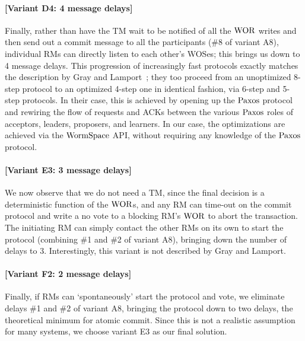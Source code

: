 \paragraph{[Variant D4: 4 message delays]} Finally, rather than have the TM wait to be notified of all the $\mathrm{WOR}$ 
writes and then send out a commit message to all the participants (\#8 of variant A8), 
individual RMs can directly listen to each other's WOSes; this brings us down to 4 message delays.
This progression of increasingly fast protocols exactly matches the description by Gray and Lamport~\cite{gray:2006}; 
they too proceed from an unoptimized 8-step protocol to an optimized 4-step one in identical fashion, via 6-step and 5-step protocols. 
In their case, this is achieved by opening up the $\mathrm{Paxos}$ protocol and rewiring the flow of requests and ACKs between the various 
$\mathrm{Paxos}$ roles of acceptors, leaders, proposers, and learners. In our case, the optimizations are achieved via the $\mathrm{WormSpace}$ API, 
without requiring any knowledge of the $\mathrm{Paxos}$ protocol.

\paragraph{[Variant E3: 3 message delays]} We now observe that we do not need a TM, 
since the final decision is a deterministic function of the $\mathrm{WOR}$s, 
and any RM can time-out on the commit protocol and write a no vote to a blocking RM's $\mathrm{WOR}$ to abort the transaction. 
The initiating RM can simply contact the other RMs on its own to start the protocol (combining \#1 and \#2 of variant A8), 
bringing down the number of delays to 3. Interestingly, this variant is not described by Gray and Lamport.


\paragraph{[Variant F2: 2 message delays]} Finally, if RMs can `spontaneously' start the protocol and vote, 
we eliminate delays \#1 and \#2 of variant A8, bringing the protocol down to two delays, 
the theoretical minimum for atomic commit. Since this is not a realistic assumption for many systems, we choose variant E3 as our final solution.





